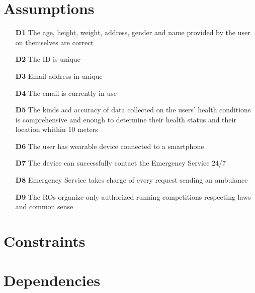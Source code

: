 \section{Assumptions}
\begin{itemize}
\item	[\textbf{D1}] The age, height, weight, address, gender and name provided by the user on themselves are correct
\item	[\textbf{D2}] The ID is unique
\item	[\textbf{D3}] Email address in unique
\item	[\textbf{D4}] The email is currently in use
\item	[\textbf{D5}] The kinds acd accuracy of data collected on the users’ health conditions is comprehensive and enough to determine their health status and their location whithin 10 meters
\item	[\textbf{D6}] The user has wearable device connected to a smartphone
\item	[\textbf{D7}] The device can successfully contact the Emergency Service 24/7
\item	[\textbf{D8}] Emergency Service takes charge of every request sending an ambulance
\item	[\textbf{D9}] The ROs organize only authorized running competitions respecting laws and common sense
\end{itemize}

\section{Constraints}
\section{Dependencies}

